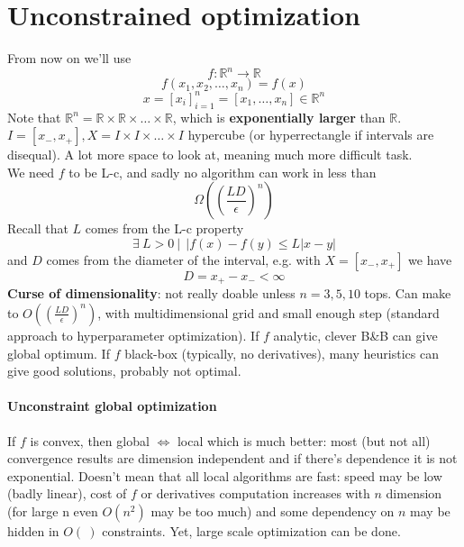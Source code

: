 \documentclass[10pt]{report}
\begin{document}
\section{Unconstrained optimization}
From now on we'll use $$f:\mathbb{R}^n\rightarrow \mathbb{R}$$ $$f(x_1,x_2,\ldots,x_n) = f(x)$$ $$x = [x_i]_{i=1}^n = [x_1,\ldots,x_n]\in \mathbb{R}^n$$
Note that $\mathbb{R}^n = \mathbb{R}\times \mathbb{R} \times\ldots\times \mathbb{R}$, which is \textbf{exponentially larger} than $\mathbb{R}$.\\
$I = [x_-, x_+], X = I\times I \times\ldots\times I$ hypercube (or hyperrectangle if intervals are disequal). A lot more space to look at, meaning much more difficult task.\\
We need $f$ to be L-c, and sadly no algorithm can work in less than $$\Omega\left(\left(\frac{LD}{\epsilon}\right)^n\right)$$
Recall that $L$ comes from the L-c property
$$\exists\:L>0\:|\:\:|f(x)-f(y)\leq L|x-y|$$
and $D$ comes from the diameter of the interval, e.g. with $X=[x_-,x_+]$ we have
$$D=x_+-x_- < \infty$$
\textbf{Curse of dimensionality}: not really doable unless $n = 3, 5, 10$ tops. Can make to $O\left(\left(\frac{LD}{\epsilon}\right)^n\right)$, with multidimensional grid and small enough step (standard approach to hyperparameter optimization). If $f$ analytic, clever B\&B can give global optimum. If $f$ black-box (typically, no derivatives), many heuristics can give good solutions, probably not optimal.
\paragraph{Unconstraint global optimization} If $f$ is convex, then global $\Leftrightarrow$ local which is much better: most (but not all) convergence results are dimension independent and if there's dependence it is not exponential. Doesn't mean that all local algorithms are fast: speed may be low (badly linear), cost of $f$ or derivatives computation increases with $n$ dimension (for large n even $O(n^2)$ may be too much) and some dependency on $n$ may be hidden in $O(\:)$ constraints. Yet, large scale optimization can be done.
\end{document}
